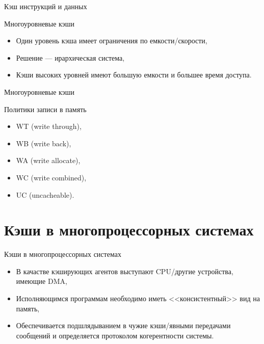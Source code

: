 \begin{frame}{Кэш инструкций и данных}
\centering
{}
\end{frame}

\begin{frame}{Многоуровневые кэши}
\begin{itemize}
    \item Один уровень кэша имеет ограничения по емкости/скорости,
    \item Решение --- ирархическая система,
    \item Кэши высоких уровней имеют большую емкости и большее время доступа.
\end{itemize}
\end{frame}

\begin{frame}{Многоуровневые кэши}
\centering
{}
\end{frame}

\begin{frame}{Политики записи в память}
\begin{itemize}
    \item WT (write through),
    \item WB (write back),
    \item WA (write allocate),
    \item WC (write combined),
    \item UC (uncacheable).
\end{itemize}
\end{frame}

\section{Кэши в многопроцессорных системах}

\begin{frame}{Кэши в многопроцессорных системах}
\begin{itemize}
    \item В качастве кэширующих агентов выступают CPU/другие устройства, имеющие DMA,
    \item Исполняющимся программам необходимо иметь <<консистентный>> вид на память,
    \item Обеспечивается подшлядыванием в чужие кэши/явными передачами
    сообщений и определяется протоколом когерентности системы.
\end{itemize}
\end{frame}

